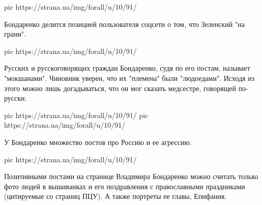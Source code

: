 \ifcmt
pic https://strana.ua/img/forall/u/10/91/%
\fi

Бондаренко делится позицией пользователя соцсети о том, что Зеленский "на грани". 

\ifcmt
pic https://strana.ua/img/forall/u/10/91/%
\fi

Русских и русскоговорящих граждан Бондаренко, судя по его постам, называет
"мокшанами". Чиновник уверен, что их "племена" были "людоедами". Исходя из
этого можно лишь догадываться, что он мог сказать медсестре, говорящей
по-русски. 

\ifcmt
pic https://strana.ua/img/forall/u/10/91/%
pic https://strana.ua/img/forall/u/10/91/%
\fi

У Бондаренко множество постов про Россию и ее агрессию.

\ifcmt
pic https://strana.ua/img/forall/u/10/91/%
\fi

Позитивными постами на странице Владимира Бондаренко можно считать только фото
людей в вышиванках и его поздравления с православными праздниками (цитируемые
со страниц ПЦУ). А также портреты ее главы, Епифания.
